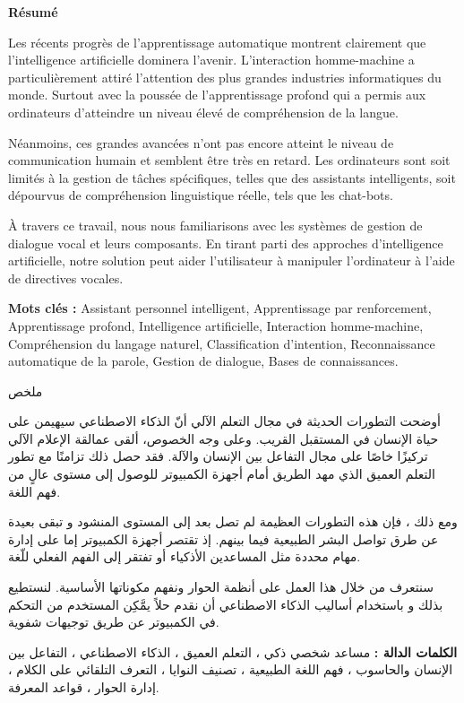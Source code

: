 \begin{center}
    \Large 
    \textbf{Résumé}
\end{center}
\setlength{\parindent}{0.5cm}
Les récents progrès de l'apprentissage automatique montrent clairement que l'intelligence artificielle dominera l'avenir.
L'interaction homme-machine a particulièrement attiré l'attention des plus grandes industries informatiques du monde.
Surtout avec la poussée de l'apprentissage profond qui a permis aux ordinateurs d'atteindre un niveau élevé de compréhension de la langue.
\par 
Néanmoins, ces grandes avancées n'ont pas encore atteint le niveau de communication humain et semblent être très en retard.
Les ordinateurs sont soit limités à la gestion de tâches spécifiques, telles que des assistants intelligents, soit dépourvus de compréhension linguistique réelle, tels que les chat-bots.
\par 
À travers ce travail, nous nous familiarisons avec les systèmes de gestion de dialogue vocal et leurs composants.
En tirant parti des approches d'intelligence artificielle, notre solution peut aider l'utilisateur à manipuler l'ordinateur à l'aide de directives vocales.
\par
\noindent
\textbf{Mots clés :} Assistant personnel intelligent, Apprentissage par renforcement, Apprentissage profond, Intelligence artificielle, Interaction homme-machine, Compréhension du langage naturel, Classification d'intention, Reconnaissance automatique de la parole, Gestion de dialogue, Bases de connaissances.

\vspace*{0.8cm}

\begin{center}
    \Large 
    \begin{arab}
    ملخص
    \end{arab}
\end{center}
\begin{arab}
	أوضحت التطورات الحديثة في مجال التعلم الآلي أنّ الذكاء الاصطناعي سيهيمن على حياة الإنسان في المستقبل القريب. وعلى وجه الخصوص، ألقى عمالقة الإعلام الآلي تركيزًا خاصًا على مجال التفاعل بين الإنسان والآلة. فقد حصل ذلك تزامنًا مع تطور التعلم العميق الذي مهد الطريق أمام أجهزة الكمبيوتر للوصول إلى مستوى عالٍ من فهم اللغة.
	
	ومع ذلك ، فإن هذه التطورات العظيمة لم تصل بعد إلى المستوى المنشود و تبقى بعيدة عن طرق تواصل البشر الطبيعية فيما بينهم. إذ تقتصر أجهزة الكمبيوتر إما على إدارة مهام محددة مثل المساعدين الأذكياء أو تفتقر إلى الفهم الفعلي للّغة.
	
	سنتعرف من خلال هذا العمل على أنظمة الحوار ونفهم مكوناتها الأساسية. لنستطيع بذلك و باستخدام أساليب الذكاء الاصطناعي أن نقدم حلاً  يمَّكِن المستخدم من التحكم في الكمبيوتر عن طريق توجيهات شفوية.
\par 
\textbf{الكلمات الدالة :} مساعد شخصي ذكي ، التعلم العميق ، الذكاء الاصطناعي ، التفاعل بين الإنسان والحاسوب ، فهم اللغة الطبيعية ، تصنيف النوايا ، التعرف التلقائي على الكلام ، إدارة الحوار ، قواعد المعرفة.
\end{arab}

